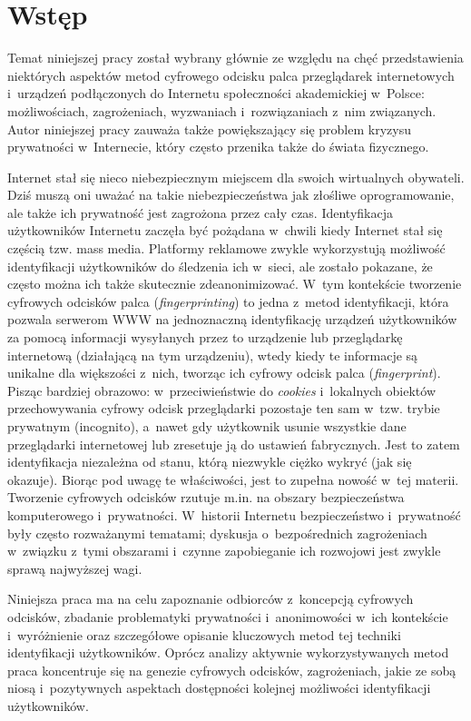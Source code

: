 \chapter*{Wstęp}
Temat niniejszej pracy został wybrany głównie ze względu na chęć przedstawienia
niektórych aspektów metod cyfrowego odcisku palca przeglądarek internetowych
i~urządzeń podłączonych do Internetu społeczności akademickiej w~Polsce:
możliwościach, zagrożeniach, wyzwaniach i~rozwiązaniach z~nim związanych. Autor
niniejszej pracy zauważa także powiększający się problem kryzysu prywatności
w~Internecie, który często przenika także do świata fizycznego.

Internet stał się nieco niebezpiecznym miejscem dla swoich wirtualnych
obywateli. Dziś muszą oni uważać na takie niebezpieczeństwa jak złośliwe
oprogramowanie, ale także ich prywatność jest zagrożona przez cały czas.
Identyfikacja użytkowników Internetu zaczęła być pożądana w~chwili kiedy
Internet stał się częścią tzw. mass media. Platformy reklamowe zwykle
wykorzystują możliwość identyfikacji użytkowników do śledzenia ich w~sieci, ale
zostało pokazane, że często można ich także skutecznie zdeanonimizować. W~tym
kontekście tworzenie cyfrowych odcisków palca (\emph{fingerprinting}) to jedna
z~metod identyfikacji, która pozwala serwerom WWW na jednoznaczną identyfikację
urządzeń użytkowników za pomocą informacji wysyłanych przez to urządzenie lub
przeglądarkę internetową (działającą na tym urządzeniu), wtedy kiedy te
informacje są unikalne dla większości z~nich, tworząc ich cyfrowy odcisk palca
(\emph{fingerprint}). Pisząc bardziej obrazowo: w~przeciwieństwie do
\emph{cookies} i~lokalnych obiektów przechowywania cyfrowy odcisk przeglądarki
pozostaje ten sam w~tzw. trybie prywatnym (incognito), a~nawet gdy użytkownik
usunie wszystkie dane przeglądarki internetowej lub zresetuje ją do ustawień
fabrycznych. Jest to zatem identyfikacja niezależna od stanu, którą niezwykle
ciężko wykryć (jak się okazuje). Biorąc pod uwagę te właściwości, jest to
zupełna nowość w~tej materii. Tworzenie cyfrowych odcisków rzutuje m.in. na
obszary bezpieczeństwa komputerowego i~prywatności. W~historii Internetu
bezpieczeństwo i~prywatność były często rozważanymi tematami; dyskusja
o~bezpośrednich zagrożeniach w~związku z~tymi obszarami i~czynne zapobieganie
ich rozwojowi jest zwykle sprawą najwyższej wagi.

Niniejsza praca ma na celu zapoznanie odbiorców z~koncepcją cyfrowych odcisków,
zbadanie problematyki prywatności i~anonimowości w~ich kontekście i~wyróżnienie
oraz szczegółowe opisanie kluczowych metod tej techniki identyfikacji
użytkowników. Oprócz analizy aktywnie wykorzystywanych metod praca koncentruje
się na genezie cyfrowych odcisków, zagrożeniach, jakie ze sobą niosą
i~pozytywnych aspektach dostępności kolejnej możliwości identyfikacji
użytkowników.

